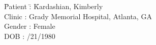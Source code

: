 \documentclass[11pt]{article}\usepackage[]{graphicx}\usepackage[]{color}
\begin{document}

\begin{tabbing}
  \= Patient \= : \= Kardashian, Kimberly \\
  \> Clinic \> : \> Grady Memorial Hospital, Atlanta, GA \\
  \> Gender \> : \> Female \\
  \> DOB \> : /21/1980 \\
\end{tabbing}

\noindent
{} 
\newline
\end{document}
